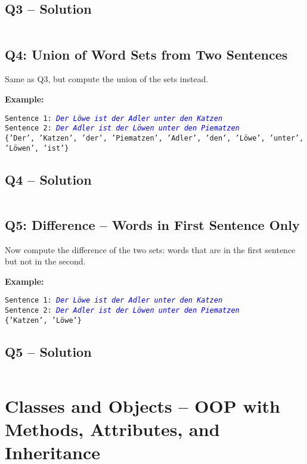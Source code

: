\documentclass[a4paper,11pt]{article}
\begin{document}
\subsection*{Q3 – Solution}
\inputminted{python}{Files/9/3.py}

\subsection*{Q4: Union of Word Sets from Two Sentences}
Same as Q3, but compute the union of the sets instead.

\textbf{Example:}
\begin{flushleft}
	\texttt{Sentence 1: \textcolor{blue}{\textit{Der Löwe ist der Adler unter den Katzen}}}\\
	\texttt{Sentence 2: \textcolor{blue}{\textit{Der Adler ist der Löwen unter den Piematzen}}}\\
	\texttt{\{'Der', 'Katzen', 'der', 'Piematzen', 'Adler', 'den', 'Löwe', 'unter', 'Löwen', 'ist'\}}
\end{flushleft}

\subsection*{Q4 – Solution}
\inputminted{python}{Files/9/4.py}

\subsection*{Q5: Difference – Words in First Sentence Only}
Now compute the difference of the two sets: words that are in the first sentence but not in the second.

\textbf{Example:}
\begin{flushleft}
	\texttt{Sentence 1: \textcolor{blue}{\textit{Der Löwe ist der Adler unter den Katzen}}}\\
	\texttt{Sentence 2: \textcolor{blue}{\textit{Der Adler ist der Löwen unter den Piematzen}}}\\
	\texttt{\{'Katzen', 'Löwe'\}}
\end{flushleft}

\subsection*{Q5 – Solution}
\inputminted{python}{Files/9/5.py}
\newpage
\section{Classes and Objects – OOP with Methods, Attributes, and Inheritance}
\end{document}
